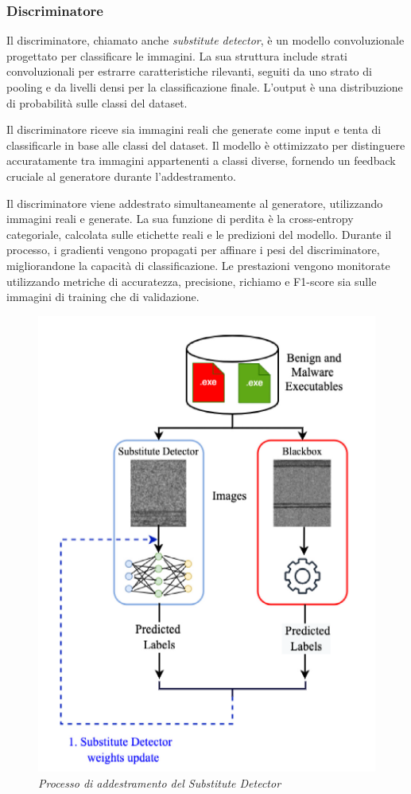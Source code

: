\newpage

\subsubsection{Discriminatore}
Il discriminatore, chiamato anche \emph{substitute detector}, è un modello convoluzionale progettato per classificare le immagini. La sua struttura include strati convoluzionali per estrarre caratteristiche rilevanti, seguiti da uno strato di pooling e da livelli densi per la classificazione finale. L'output è una distribuzione di probabilità sulle classi del dataset.

Il discriminatore riceve sia immagini reali che generate come input e tenta di classificarle in base alle classi del dataset. Il modello è ottimizzato per distinguere accuratamente tra immagini appartenenti a classi diverse, fornendo un feedback cruciale al generatore durante l'addestramento.

Il discriminatore viene addestrato simultaneamente al generatore, utilizzando immagini reali e generate. La sua funzione di perdita è la cross-entropy categoriale, calcolata sulle etichette reali e le predizioni del modello. Durante il processo, i gradienti vengono propagati per affinare i pesi del discriminatore, migliorandone la capacità di classificazione. Le prestazioni vengono monitorate utilizzando metriche di accuratezza, precisione, richiamo e F1-score sia sulle immagini di training che di validazione.

\begin{figure}[ht]
    \centering
        \centering
        \includegraphics[width=0.5\linewidth]{images/discriminator_train.png}
        \caption{\emph{Processo di addestramento del Substitute Detector}}
        \label{fig:discriminator_train}
\end{figure}

